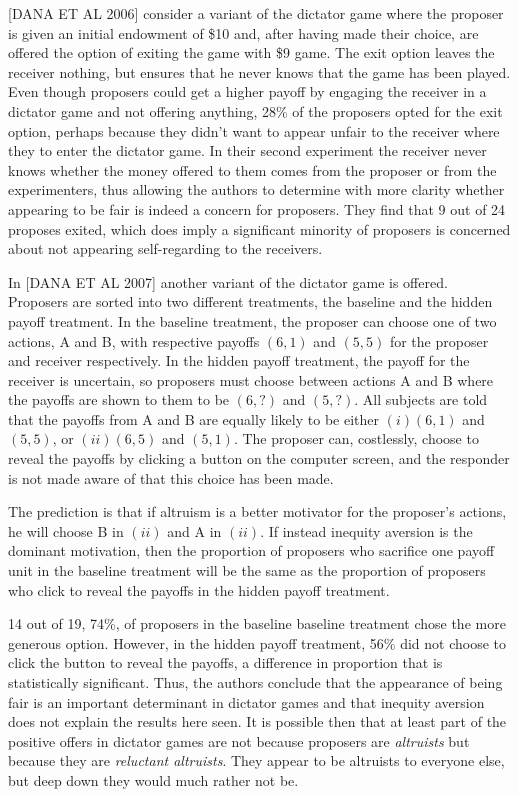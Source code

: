 \message{ !name(tese.tex)}\documentclass{article}
\begin{document}
[DANA ET AL 2006]  consider a variant of the dictator game where the proposer is given an initial endowment of \$10 and, after having made their choice, are offered the option of exiting the game with \$9 game. The exit option leaves the receiver nothing, but ensures that he never knows that the game has been played. Even though proposers could get a higher payoff by engaging the receiver in a dictator game and not offering anything, 28\% of the proposers opted for the exit option, perhaps because they didn't want to appear unfair to the receiver where they to enter the dictator game. In their second experiment the receiver never knows whether the money offered to them comes from the proposer or from the experimenters, thus allowing the authors to determine with more clarity whether appearing to be fair is indeed a concern for proposers. They find that 9 out of 24 proposes exited, which does imply a significant minority of proposers is concerned about not appearing self-regarding to the receivers.

In [DANA ET AL 2007] another variant of the dictator game is offered. Proposers are sorted into two different treatments, the baseline and the hidden payoff treatment. In the baseline treatment, the proposer can choose one of two actions, A and B, with respective payoffs $\left(6,1\right)$ and $\left(5,5\right)$ for the proposer and receiver respectively. In the hidden payoff treatment, the payoff for the receiver is uncertain, so proposers must choose between actions A and B where the payoffs are shown to them to be $\left(6,?\right)$ and $\left(5,?\right)$. All subjects are told that the payoffs from A and B are equally likely to be either $\left(i\right)\left(6,1\right)$ and $\left(5,5\right)$, or $ \left(ii\right)\left(6,5\right)$ and $\left(5,1\right)$. The proposer can, costlessly, choose to reveal the payoffs by clicking a button on the computer screen, and the responder is not made aware of that this choice has been made.

The prediction is that if altruism is a better motivator for the proposer's actions, he will choose B in $\left(ii\right)$ and A in $\left(ii\right)$. If instead inequity aversion is the dominant motivation, then the proportion of proposers who sacrifice one payoff unit in the baseline treatment will be the same as the proportion of proposers who click to reveal the payoffs in the hidden payoff treatment. 

14 out of 19, 74\%, of proposers in the baseline baseline treatment chose the more generous option. However, in the hidden payoff treatment, 56\% did not choose to click the button to reveal the payoffs, a difference in proportion that is statistically significant. Thus, the authors conclude that the appearance of being fair is an important determinant in dictator games and that inequity aversion does not explain the results here seen. It is possible then that at least part of the positive offers in dictator games are not because proposers are \textit{altruists} but because they are \textit{reluctant altruists}. They appear to be altruists to everyone else, but deep down they would much rather not be.
\end{document}
